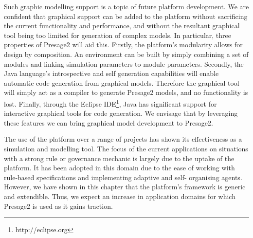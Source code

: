Such graphic modelling support is a topic of future platform development. We are
confident that graphical support can be added to the platform without
sacrificing the current functionality and performance, and without the resultant
graphical tool being too limited for generation of complex models. In
particular, three properties of Presage2 will aid this. Firstly, the platform's
modularity allows for design by composition. An environment can be built by
simply combining a set of modules and linking simulation parameters to module
parameters. Secondly, the Java language's introspective and self generation
capabilities will enable automatic code generation from graphical models.
Therefore the graphical tool will simply act as a compiler to generate Presage2
models, and no functionality is lost. Finally, through the Eclipse IDE\footnote{
http://eclipse.org}, Java has significant support for interactive graphical
tools for code generation. We envisage that by leveraging these features we can
bring graphical model development to Presage2.

The use of the platform over a range of projects has shown its effectiveness
as a simulation and modelling tool. The focus of the current applications on
situations with a strong rule or governance mechanic is largely due to the
uptake of the platform. It has been adopted in this domain due to the ease of
working with rule-based specifications and implementing adaptive and self-
organising agents. However, we have shown in this chapter that the platform's
framework is generic and extendible. Thus, we expect an increase in application
domains for which Presage2 is used as it gains traction.



